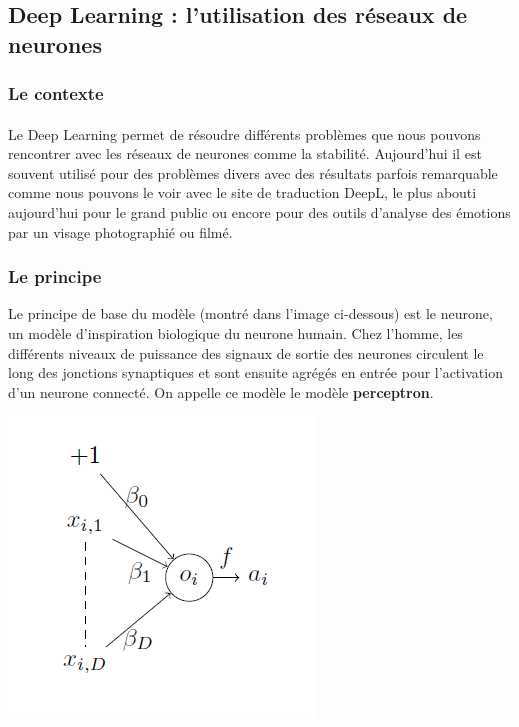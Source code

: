 \documentclass[14pt, openany]{article}
\begin{document}
\subsection{Deep Learning : l'utilisation des réseaux de neurones}

\subsubsection{Le contexte}
\paragraph{}
Le Deep Learning permet de résoudre différents problèmes que nous pouvons rencontrer avec les réseaux de neurones comme la stabilité. Aujourd'hui il est souvent utilisé pour des problèmes divers avec des résultats parfois remarquable comme nous pouvons le voir avec le site de traduction DeepL, le plus abouti aujourd'hui pour le grand public ou encore pour des outils d'analyse des émotions par un visage photographié ou filmé.

\subsubsection{Le principe}
Le principe de base du modèle (montré dans l'image ci-dessous) est le neurone, un modèle d'inspiration biologique du neurone humain. Chez l'homme, les différents niveaux de puissance des signaux de sortie des neurones circulent le long des jonctions synaptiques et sont ensuite agrégés en entrée pour l'activation d'un neurone connecté. On appelle ce modèle le modèle \textbf{perceptron}.

\begin{center}
\includegraphics[scale=0.7]{Images/perceptron.png}
\end{center}
\end{document}
